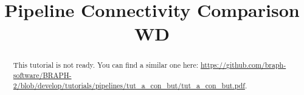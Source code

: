 \documentclass[justified]{tufte-handout}
\title{Pipeline Connectivity Comparison WD}
\begin{document}
\maketitle

\begin{abstract}
\noindent
This tutorial is not ready. You can find a similar one here: \url{https://github.com/braph-software/BRAPH-2/blob/develop/tutorials/pipelines/tut_a_con_but/tut_a_con_but.pdf}.
\end{abstract}
\end{document}
